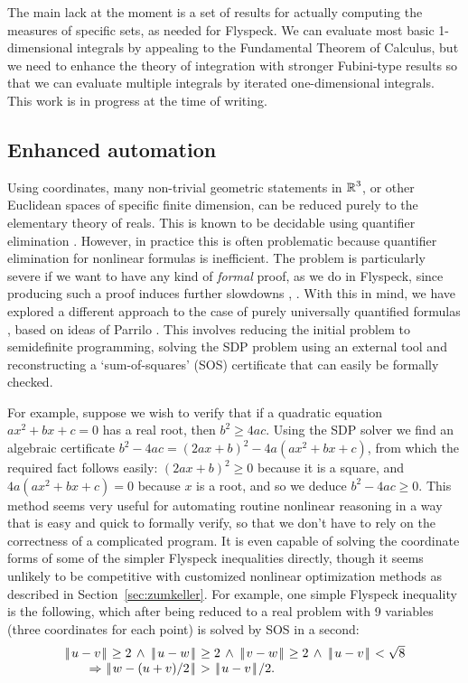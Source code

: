 \documentclass[11pt]{amsart}
\def\|{{\hskip0.1em|\hskip-0.15em|\hskip0.1em}}
\newcommand{\real}{\mbox{$\protect\mathbb R$}}
\let\And=\wedge                    %
\newcommand{\Imp}{\Rightarrow}
\begin{document}
The main lack at the moment is a set of results for actually computing the
measures of specific sets, as needed for Flyspeck. We can evaluate most basic
1-dimensional integrals by appealing to the Fundamental Theorem of Calculus,
but we need to enhance the theory of integration with stronger Fubini-type
results so that we can evaluate multiple integrals by iterated one-dimensional
integrals. This work is in progress at the time of writing.

\subsection{Enhanced automation}

Using coordinates, many non-trivial geometric statements in $\real^3$, or other
Euclidean spaces of specific finite dimension, can be reduced purely to the
elementary theory of reals. This is known to be decidable using quantifier
elimination \cite{tarski-decision,collins,hormander-pdo2}. However, in practice
this is often problematic because quantifier elimination for nonlinear formulas
is inefficient. The problem is particularly severe if we want to have any kind
of {\em formal} proof, as we do in Flyspeck, since producing such a proof
induces further slowdowns \cite{mahboubi-hormander}, \cite{mclaughlin-harrison}. With
this in mind, we have explored a different approach to the case of purely
universally quantified formulas \cite{harrison-sos}, based on ideas of Parrilo
\cite{parrilo-semidefinite}. This involves reducing the initial problem to
semidefinite programming, solving the SDP problem using an external tool and
reconstructing a `sum-of-squares' (SOS) certificate that can easily be formally
checked.

For example, suppose we wish to verify that if a quadratic equation $a x^2 + b
x + c = 0$ has a real root, then $b^2 \geq 4 a c$. Using the SDP solver we find
an algebraic certificate $b^2 - 4 a c = (2 a x + b)^2 - 4 a (a x^2 + b x + c)$,
from which the required fact follows easily: $(2 a x + b)^2 \geq 0$ because it
is a square, and $4 a (a x^2 + b x + c) = 0$ because $x$ is a root, and so we
deduce $b^2 - 4 a c \geq 0$. This method seems very useful for automating
routine nonlinear reasoning in a way that is easy and quick to formally verify,
so that we don't have to rely on the correctness of a complicated program. It
is even capable of solving the coordinate forms of some of the simpler Flyspeck
inequalities directly, though it seems unlikely to be competitive with
customized nonlinear optimization methods as described in Section~\ref{sec:zumkeller}. For
example, one simple Flyspeck inequality is the following, which after being
reduced to a real problem with 9 variables (three coordinates for each point)
is solved by SOS in a second:
$$\begin{array}{lll}
 \|u - v\| \geq 2 \,\And\, \|u - w\| \geq 2 \,\And\, \|v - w\| \geq 2 \,\And\,
   \|u - v\| < \sqrt{8}\\
   \qquad\Imp \|w - (u + v)/2\| > \|u - v\|/2.
\end{array}
$$
\end{document}
